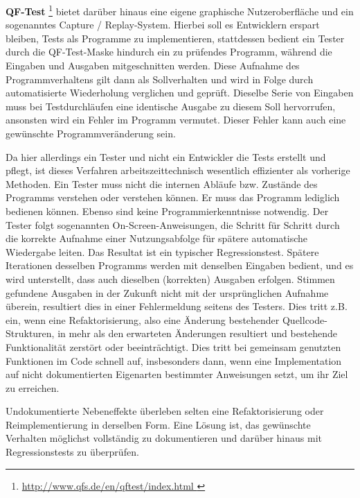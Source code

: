 \vspace{0.5cm}

\textbf{QF-Test} \footnote{\url{ http://www.qfs.de/en/qftest/index.html }} 
bietet darüber hinaus eine eigene graphische Nutzeroberfläche
und ein sogenanntes \glqq{}Capture / Replay\grqq{}-System. Hierbei soll es Entwicklern erspart bleiben,
Tests als Programme zu implementieren, stattdessen bedient ein Tester durch die QF-Test-Maske
hindurch ein zu prüfendes Programm, während die Eingaben und Ausgaben mitgeschnitten werden.
Diese Aufnahme des Programmverhaltens gilt dann als \glqq{}Sollverhalten\grqq{} und wird in Folge
durch automatisierte Wiederholung verglichen und geprüft. Dieselbe Serie von Eingaben muss
bei Testdurchläufen eine identische Ausgabe zu diesem Soll hervorrufen, ansonsten
wird ein Fehler im Programm vermutet. Dieser Fehler kann auch eine gewünschte Programmveränderung sein.

Da hier allerdings ein Tester und nicht ein Entwickler die Tests erstellt und pflegt, ist dieses
Verfahren arbeitszeittechnisch wesentlich effizienter als vorherige Methoden. Ein Tester muss
nicht die internen Abläufe bzw. Zustände des Programms verstehen oder verstehen können. Er muss das Programm lediglich
bedienen können. Ebenso sind keine Programmierkenntnisse notwendig. Der Tester folgt sogenannten
\glqq{}On-Screen\grqq{}-Anweisungen, die Schritt für Schritt durch die korrekte Aufnahme einer
Nutzungsabfolge für spätere automatische Wiedergabe leiten. Das Resultat ist ein typischer
Regressionstest. Spätere Iterationen desselben Programms werden mit denselben Eingaben
bedient, und es wird unterstellt, dass auch dieselben (korrekten) Ausgaben erfolgen.
Stimmen gefundene Ausgaben in der Zukunft nicht mit der ursprünglichen Aufnahme überein, resultiert
dies in einer Fehlermeldung seitens des Testers. Dies tritt z.B. ein, wenn eine Refaktorisierung,
also eine Änderung bestehender Quellcode-Strukturen, in mehr als den erwarteten Änderungen
resultiert und bestehende Funktionalität zerstört oder beeinträchtigt. Dies tritt bei
gemeinsam genutzten Funktionen im Code schnell auf, insbesonders dann, wenn eine Implementation 
auf nicht dokumentierten Eigenarten bestimmter Anweisungen setzt, um ihr Ziel zu erreichen.

Undokumentierte Nebeneffekte überleben selten eine Refaktorisierung oder Reimplementierung
in derselben Form. Eine Lösung ist, das gewünschte Verhalten möglichst vollständig zu dokumentieren
und darüber hinaus mit Regressionstests zu überprüfen.


\vspace{0.5cm}

